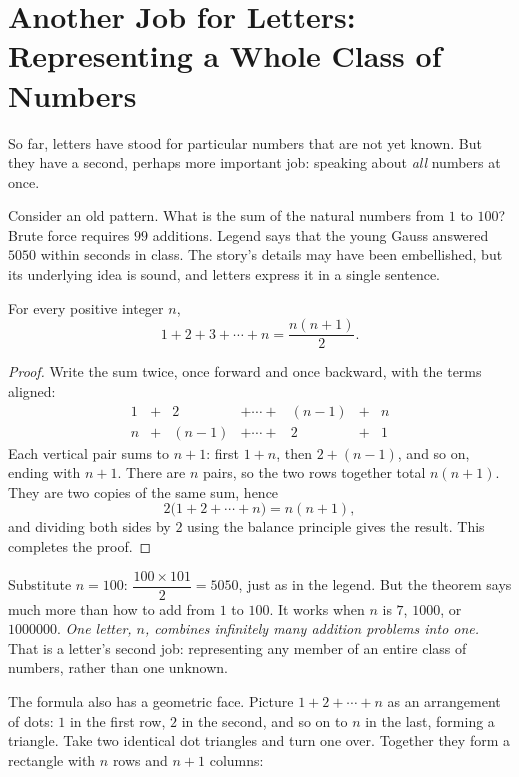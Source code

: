\section{Another Job for Letters: Representing a Whole Class of Numbers}

So far, letters have stood for particular numbers that are not yet known. But they have a second, perhaps more important job: speaking about \emph{all} numbers at once.

Consider an old pattern. What is the sum of the natural numbers from $1$ to $100$? Brute force requires $99$ additions. Legend says that the young Gauss answered $5050$ within seconds in class. The story's details may have been embellished, but its underlying idea is sound, and letters express it in a single sentence.

\begin{dingli}
For every positive integer $n$,
\[
1+2+3+\cdots+n=\frac{n(n+1)}{2}.
\]
\end{dingli}

\begin{proof}
Write the sum twice, once forward and once backward, with the terms aligned:
\[
\begin{array}{ccccccc}
1 & + & 2 & + \cdots + & (n-1) & + & n\\
n & + & (n-1) & + \cdots + & 2 & + & 1
\end{array}
\]
Each vertical pair sums to $n+1$: first $1+n$, then $2+(n-1)$, and so on, ending with $n+1$. There are $n$ pairs, so the two rows together total $n(n+1)$. They are two copies of the same sum, hence
\[
2\bigl(1+2+\cdots+n\bigr)=n(n+1),
\]
and dividing both sides by $2$ using the balance principle gives the result. This completes the proof.
\end{proof}

Substitute $n=100$: $\dfrac{100\times101}{2}=5050$, just as in the legend. But the theorem says much more than how to add from $1$ to $100$. It works when $n$ is $7$, $1000$, or $1000000$. \emph{One letter, $n$, combines infinitely many addition problems into one.} That is a letter's second job: representing any member of an entire class of numbers, rather than one unknown.

The formula also has a geometric face. Picture $1+2+\cdots+n$ as an arrangement of dots: $1$ in the first row, $2$ in the second, and so on to $n$ in the last, forming a triangle. Take two identical dot triangles and turn one over. Together they form a rectangle with $n$ rows and $n+1$ columns:

